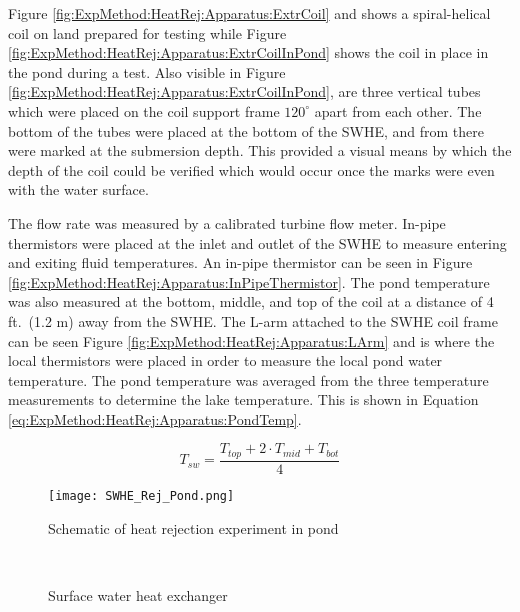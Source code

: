 Figure \ref{fig:ExpMethod:HeatRej:Apparatus:ExtrCoil} and shows a spiral-helical coil on land prepared for testing while Figure  \ref{fig:ExpMethod:HeatRej:Apparatus:ExtrCoilInPond} shows the coil in place in the pond during a test. Also visible in Figure \ref{fig:ExpMethod:HeatRej:Apparatus:ExtrCoilInPond},  are three vertical tubes which were placed on the coil support frame $120^\circ$ apart from each other. The bottom of the tubes were placed at the bottom of the SWHE, and from there were marked at the submersion depth. This provided a visual means by which the depth of the coil could be verified which would occur once the marks were even with the water surface.

The flow rate was measured by a calibrated turbine flow meter. In-pipe thermistors were placed at the inlet and outlet of the SWHE to measure entering and exiting fluid temperatures. An in-pipe thermistor can be seen in Figure \ref{fig:ExpMethod:HeatRej:Apparatus:InPipeThermistor}. The pond temperature was also measured at the bottom, middle, and top of the coil at a distance of 4 ft.\ (1.2 m)  away from the SWHE. The L-arm attached to the SWHE coil frame can be seen Figure \ref{fig:ExpMethod:HeatRej:Apparatus:LArm} and is where the local thermistors were placed in order to measure the local pond water temperature. The pond temperature was averaged from the three temperature measurements to determine the lake temperature. This is shown in Equation \ref{eq:ExpMethod:HeatRej:Apparatus:PondTemp}.

\begin{equation}
	T_{sw} = \frac{T_{top} + 2 \cdot T_{mid} + T_{bot}}{4}
	\label{eq:ExpMethod:HeatRej:Apparatus:PondTemp}
\end{equation}



	\begin{figure}
		\centering
		\texttt{[image: SWHE\_Rej\_Pond.png]}
		\caption[Schematic of heat rejection experiment in pond]{Schematic of heat rejection experiment in pond}
		\label{fig:ExpMethod:HeatRej:Apparatus:RejExpPond}
	\end{figure}

	\begin{figure}
		\centering
		\,
		\caption[Surface water heat exchanger]{Surface water heat exchanger}
		\label{fig:ExpMethod:HeatRej:Apparatus:RejCoilInPond}
	\end{figure}



